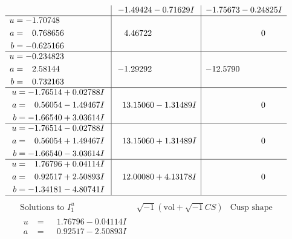 \documentclass[1p]{elsarticle_modified}
\theoremstyle{definition}
\newcommand{\I}{\sqrt{-1}}
\begin{document}
$$\begin{array}{c|c|c}
 & -1.49424 - 0.71629 I & -1.75673 - 0.24825 I \\ \hline\begin{aligned}
u &= -1.70748\phantom{ +0.000000I} \\
a &= \phantom{-}0.768656\phantom{ +0.000000I} \\
b &= -0.625166\phantom{ +0.000000I}\end{aligned}
 & \phantom{-}4.46722\phantom{ +0.000000I} & \phantom{-0.000000 } 0 \\ \hline\begin{aligned}
u &= -0.234823\phantom{ +0.000000I} \\
a &= \phantom{-}2.58144\phantom{ +0.000000I} \\
b &= \phantom{-}0.732163\phantom{ +0.000000I}\end{aligned}
 & -1.29292\phantom{ +0.000000I} & -12.5790\phantom{ +0.000000I} \\ \hline\begin{aligned}
u &= -1.76514 + 0.02788 I \\
a &= \phantom{-}0.56054 - 1.49467 I \\
b &= -1.66540 + 3.03614 I\end{aligned}
 & \phantom{-}13.15060 - 1.31489 I & \phantom{-0.000000 } 0 \\ \hline\begin{aligned}
u &= -1.76514 - 0.02788 I \\
a &= \phantom{-}0.56054 + 1.49467 I \\
b &= -1.66540 - 3.03614 I\end{aligned}
 & \phantom{-}13.15060 + 1.31489 I & \phantom{-0.000000 } 0 \\ \hline\begin{aligned}
u &= \phantom{-}1.76796 + 0.04114 I \\
a &= \phantom{-}0.92517 + 2.50893 I \\
b &= -1.34181 - 4.80741 I\end{aligned}
 & \phantom{-}12.00080 + 4.13178 I & \phantom{-0.000000 } 0\\
 \hline 
 \end{array}$$\newpage$$\begin{array}{c|c|c}  
\text{Solutions to }I^u_{1}& \I (\text{vol} + \sqrt{-1}CS) & \text{Cusp shape}\\
 \hline 
\begin{aligned}
u &= \phantom{-}1.76796 - 0.04114 I \\
a &= \phantom{-}0.92517 - 2.50893 I \\

\end{aligned}
\end{array}$$
\end{document}
